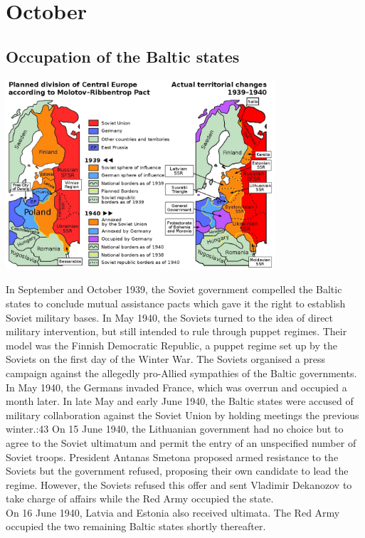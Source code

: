 \documentclass[11pt]{report}
\begin{document}
\section{October}
\subsection{Occupation of the Baltic states}
\vspace{2mm}\begin{center}\includegraphics[width=10cm]{./img/occupBalticStates.jpg}\end{center}
In September and October 1939, the Soviet government compelled the Baltic states to conclude mutual assistance pacts which gave it the right to establish Soviet military bases. In May 1940, the Soviets turned to the idea of direct military intervention, but still intended to rule through puppet regimes. Their model was the Finnish Democratic Republic, a puppet regime set up by the Soviets on the first day of the Winter War. The Soviets organised a press campaign against the allegedly pro-Allied sympathies of the Baltic governments. In May 1940, the Germans invaded France, which was overrun and occupied a month later. In late May and early June 1940, the Baltic states were accused of military collaboration against the Soviet Union by holding meetings the previous winter.:43 On 15 June 1940, the Lithuanian government had no choice but to agree to the Soviet ultimatum and permit the entry of an unspecified number of Soviet troops. President Antanas Smetona proposed armed resistance to the Soviets but the government refused, proposing their own candidate to lead the regime. However, the Soviets refused this offer and sent Vladimir Dekanozov to take charge of affairs while the Red Army occupied the state.\\ \indent On 16 June 1940, Latvia and Estonia also received ultimata. The Red Army occupied the two remaining Baltic states shortly thereafter.
\end{document}
